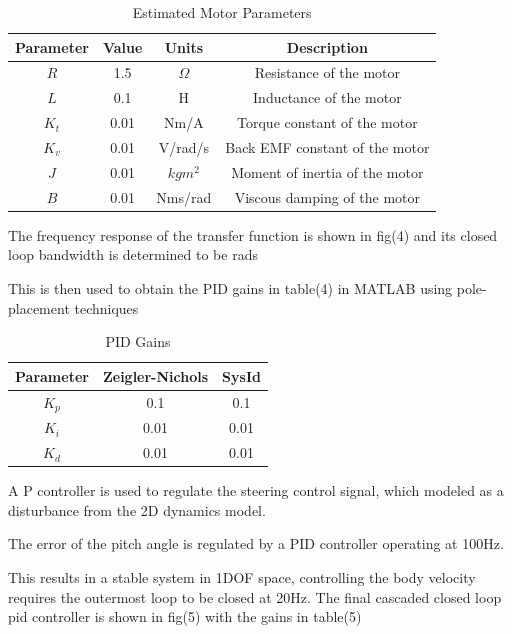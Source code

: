         \begin{table}[H]
            \centering
            \begin{tabular}{|c|c|c|c|}
                \hline
                Parameter & Value & Units & Description \\
                \hline
                $R$ & 1.5 & $\Omega$ & Resistance of the motor \\
                $L$ & 0.1 & H & Inductance of the motor \\
                $K_t$ & 0.01 & Nm/A & Torque constant of the motor \\
                $K_v$ & 0.01 & V/rad/s & Back EMF constant of the motor \\
                $J$ & 0.01 & $kgm^2$ & Moment of inertia of the motor \\
                $B$ & 0.01 & Nms/rad & Viscous damping of the motor \\
                \hline
            \end{tabular}
            \caption{Estimated Motor Parameters}
        \end{table}

        The frequency response of the transfer function is shown in fig(4) and its closed loop bandwidth is determined to be rads

        This is then used to obtain the PID gains in table(4) in MATLAB using pole-placement techniques
        \begin{table}[H]
            \centering
            \begin{tabular}{|c|c|c|}
                \hline
                Parameter & Zeigler-Nichols & SysId \\
                \hline 
                $K_p$ & 0.1 & 0.1 \\
                $K_i$ & 0.01 & 0.01 \\
                $K_d$ & 0.01 & 0.01 \\
                \hline
            \end{tabular}
            \caption{PID Gains}
        \end{table}

        A P controller is used to regulate the steering control signal, which modeled
        as a disturbance from the 2D dynamics model.

        The error of the pitch angle is regulated by a PID controller operating at 100Hz. 
        
        This results in a stable system in 1DOF space, controlling the body velocity requires the outermost loop to be closed at 20Hz.
        The final cascaded closed loop pid controller is shown in fig(5) with the gains in table(5)

